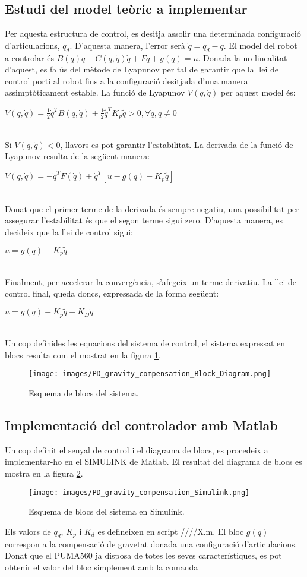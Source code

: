 \documentclass[]{article}
\begin{document}
\subsection{Estudi del model teòric a implementar}
Per aquesta estructura de control, es desitja assolir una determinada configuració d'articulacions, $q_{d}$. D'aquesta manera, l'error serà $\tilde{q} = q_{d} - q$. El model del robot a controlar és $B(q)\ddot{q} + C(q, \dot{q})\dot{q} + F\dot{q} + g(q) = u$. Donada la no linealitat d'aquest, es fa ús del mètode de Lyapunov per tal de garantir que la llei de control porti al robot fins a la configuració desitjada d'una manera assimptòticament estable. La funció de Lyapunov $V(q, \dot{q})$ per aquest model és: \\
\centerline{$V(q, \dot{q}) = \frac{1}{2}\dot{q}^TB(q,\dot{q}) +  \frac{1}{2}\tilde{q}^TK_{p}\tilde{q} > 0 , \forall\dot{q},q \neq 0$ } \leavevmode \\
Si $\dot{V}(q, \dot{q}) < 0$, llavors es pot garantir l'estabilitat. La derivada de la funció de Lyapunov resulta de la següent manera: \\
\centerline{$\dot{V}(q, \dot{q})= -\dot{q}^TF(\dot{q}) + \dot{q}^T[u - g(q) - K_{p}\tilde{q}]$} \leavevmode \\
Donat que el primer terme de la derivada és sempre negatiu, una possibilitat per assegurar l'estabilitat és que el segon terme sigui zero. D'aquesta manera, es decideix que la llei de control sigui: \\
\centerline{$u = g(q) + K_{p}\tilde{q}$} \leavevmode \\
Finalment, per accelerar la convergència, s'afegeix un terme derivatiu. La llei de control final, queda doncs, expressada de la forma següent: \\
\centerline{$u = g(q) + K_{p}\tilde{q} -K_{D}\dot{q}$} \leavevmode \\
Un cop definides les equacions del sistema de control, el sistema expressat en blocs resulta com el mostrat en la figura \ref{fig:PD_block_diagram}. \\

\begin{figure}[H]
\centering
    \texttt{[image: images/PD\_gravity\_compensation\_Block\_Diagram.png]}
    \caption{Esquema de blocs del sistema.}
    \label{fig:PD_block_diagram}
\end{figure}

\subsection{Implementació del controlador amb Matlab}
Un cop definit el senyal de control i el diagrama de blocs, es procedeix a implementar-ho en el SIMULINK de Matlab. El resultat del diagrama de blocs es mostra en la figura \ref{fig:PD_simulink}. \\
\begin{figure}[H]
\centering
    \texttt{[image: images/PD\_gravity\_compensation\_Simulink.png]}
    \caption{Esquema de blocs del sistema en Simulink.}
    \label{fig:PD_simulink}
\end{figure}

Els valors de $q_{d}$, $K_{p}$ i $K_{d}$ es defineixen en script ////X.m. El bloc $g(q)$ correspon a la compensació de gravetat donada una configuració d'articulacions. Donat que el PUMA560 ja disposa de totes les seves característiques, es pot obtenir el valor del bloc simplement amb la comanda
\end{document}
